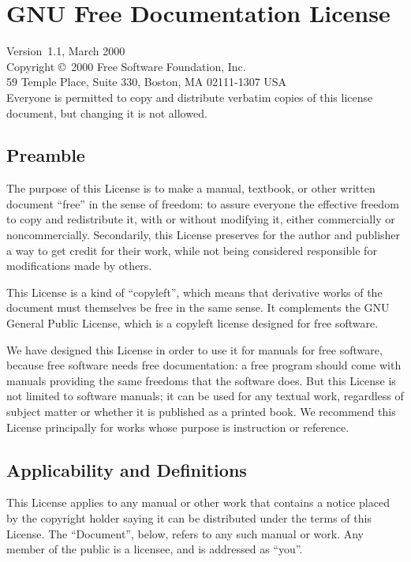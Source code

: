 \documentclass[11pt,a4paper,oneside]{alb-corp}
\begin{document}

\section{GNU Free Documentation License}
\label{sec:gnu-free-doc-license}

Version~1.1, March 2000\\
 [0.25\baselineskip] Copyright \copyright\
2000 Free Software Foundation, Inc.\\
 [0.25\baselineskip] 59 Temple
Place, Suite 330, Boston, MA 02111-1307 USA\\
 Everyone is permitted to copy and distribute verbatim copies of this
license document, but changing it is not allowed.


\subsection*{Preamble}

The purpose of this License is to make a manual, textbook, or other
written document ``free'' in the sense of freedom: to assure everyone
the effective freedom to copy and redistribute it, with or without
modifying it, either commercially or noncommercially.  Secondarily, this
License preserves for the author and publisher a way to get credit for
their work, while not being considered responsible for modifications
made by others.

This License is a kind of ``copyleft'', which means that derivative
works of the document must themselves be free in the same sense.  It
complements the GNU General Public License, which is a copyleft license
designed for free software.

We have designed this License in order to use it for manuals for free
software, because free software needs free documentation: a free program
should come with manuals providing the same freedoms that the software
does.  But this License is not limited to software manuals; it can be
used for any textual work, regardless of subject matter or whether it is
published as a printed book.  We recommend this License principally for
works whose purpose is instruction or reference.


\subsection{Applicability and Definitions}
\label{sec:gnu-free-doc-license:appl-defin}

This License applies to any manual or other work that contains a notice
placed by the copyright holder saying it can be distributed under the
terms of this License.  The ``Document'', below, refers to any such
manual or work.  Any member of the public is a licensee, and is
addressed as ``you''.
\end{document}
